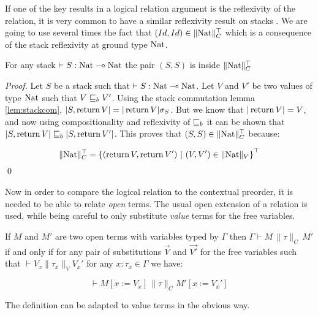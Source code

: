 If one of the key results in 
a logical relation argument is the reflexivity of the relation, 
it is very common to have a similar reflexivity result on stacks \cite{Pitts2000}.
We are going to use several times the fact that $(Id,Id) \in \| \textnormal{Nat} \|_C^\top$
which is a consequence of the stack reflexivity at ground type $\textnormal{Nat}$.

\begin{lemma}
    \label{lem:stackrefl}
    For any stack $\vdash S : \textnormal{Nat} \multimap \textnormal{Nat}$ the pair $(S,S)$ is inside $\| \textnormal{Nat} \|_C^\top$
\end{lemma}

\begin{proof}
    Let $S$ be a stack such that $\vdash S : \textnormal{Nat} \multimap \textnormal{Nat}$. Let 
    $V$ and $V'$ be two values of type $\textnormal{Nat}$ such that $V \sqsubseteq_b V'$.
    Using the stack commutation lemma \ref{lem:stackcom}, $|S, \operatorname{return} V| = |\operatorname{return}
    V| \sigma_S$. But we know that $|\operatorname{return} V| = V$, and now using
    compositionality and reflexivity of $\sqsubseteq_b$ it can be shown 
    that $|S, \operatorname{return} V| \sqsubseteq_b |S, \operatorname{return} V'|$. This proves that $(S,S) \in \| \textnormal{Nat}
    \|_C^\top$ because:

    \begin{equation*}
        \| \textnormal{Nat} \|_C^\top = \left\{ (\operatorname{return} V, \operatorname{return} V') ~|~ (V,V') \in \| \textnormal{Nat} \|_V
        \right\}^\top
    \end{equation*}
\qed\end{proof}

Now in order to compare the logical relation to the contextual preorder,
it is needed to be able to relate \emph{open} terms. The usual 
open extension of a relation is used, while being careful to only 
substitute \emph{value} terms for the free variables.

\begin{definition}
    If $M$ and $M'$ are two open terms with variables 
    typed by $\Gamma$ then $\Gamma \vdash M \, \| \tau \|_C \, M'$ if 
    and only if for any pair of substitutions $\vec{V}$ and $\vec{V'}$
    for the free variables such that $\vdash V_x \| \tau_x \|_V V_x'$
    for any $x : \tau_x \in \Gamma$ we have:

    \begin{equation*}
        \vdash M[ x := V_x ] \, \| \tau \|_C M' [ x := V_x' ]
    \end{equation*}

    The definition can be adapted to value terms in the obvious way.
\end{definition}


